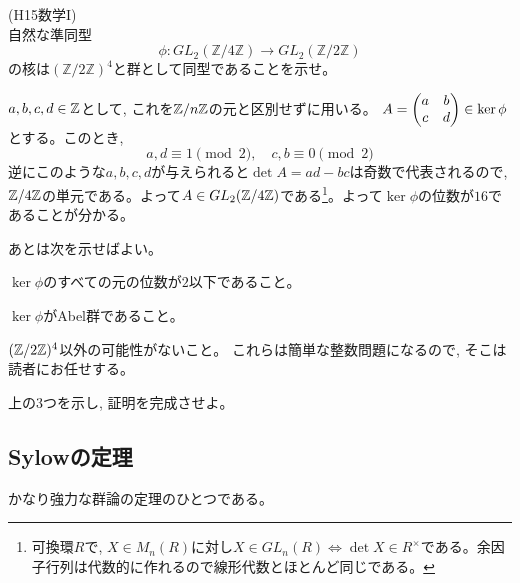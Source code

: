 \begin{egprob} (H15数学I)\\
自然な準同型
\[\phi:GL_{2}(\mathbb{Z}/4\mathbb{Z}) \to GL_{2}(\mathbb{Z}/2\mathbb{Z})\]
の核は$(\mathbb{Z}/2\mathbb{Z})^4$と群として同型であることを示せ。
\end{egprob}
\begin{egans}
$a,b,c,d\in \mathbb{Z}$として, これを$\mathbb{Z}/n\mathbb{Z}$の元と区別せずに用いる。
$A=\begin{pmatrix} a & b \\ c & d \end{pmatrix} \in \ker{\phi}$とする。このとき,
\[a,d\equiv 1\pmod{2},\quad  c,b\equiv 0\pmod{2}\]
逆にこのような$a,b,c,d$が与えられると$\det{A} = ad-bc$は奇数で代表されるので, $\mathbb{Z}/4\mathbb{Z}$の単元である。よって$A\in GL_2(\mathbb{Z}/4\mathbb{Z})$である\footnote{可換環$R$で, $X\in M_n(R)$に対し$X\in GL_n(R)\iff \det{X} \in R^{\times}$である。余因子行列は代数的に作れるので線形代数とほとんど同じである。}。よって$\ker{\phi}$の位数が$16$であることが分かる。\par
あとは次を示せばよい。
\ben
\item $\ker{\phi}$のすべての元の位数が$2$以下であること。
\item $\ker{\phi}$がAbel群であること。
\item $(\mathbb{Z}/2\mathbb{Z})^4$以外の可能性がないこと。
\een
これらは簡単な整数問題になるので, そこは読者にお任せする。
\end{egans}
\begin{prac}
上の3つを示し, 証明を完成させよ。
\end{prac}





\newpage
\subsection{Sylowの定理}
かなり強力な群論の定理のひとつである。

